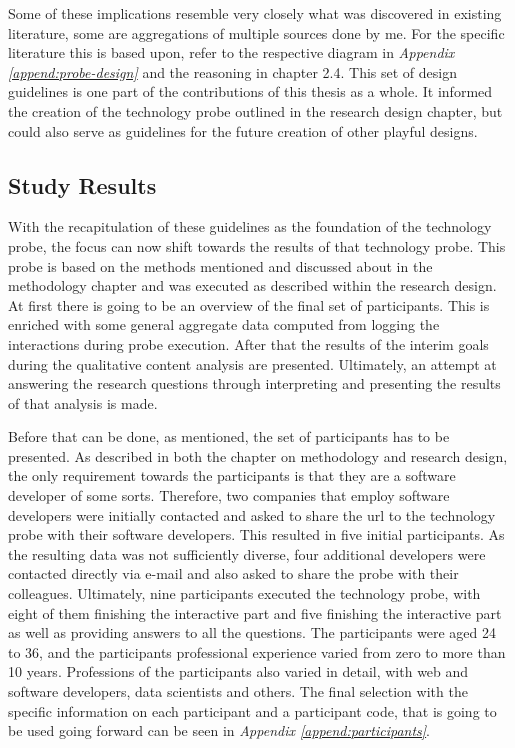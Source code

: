 Some of these implications resemble very closely what was discovered in existing literature, some are aggregations of multiple sources done by me. For the specific literature this is based upon, refer to the respective diagram in \textit{Appendix \ref{append:probe-design}} and the reasoning in chapter 2.4. This set of design guidelines is one part of the contributions of this thesis as a whole. It informed the creation of the technology probe outlined in the research design chapter, but could also serve as guidelines for the future creation of other playful designs.

\subsection{Study Results}

With the recapitulation of these guidelines as the foundation of the technology probe, the focus can now shift towards the results of that technology probe. This probe is based on the methods mentioned and discussed about in the methodology chapter and was executed as described within the research design. At first there is going to be an overview of the final set of participants. This is enriched with some general aggregate data computed from logging the interactions during probe execution. After that the results of the interim goals during the qualitative content analysis are presented. Ultimately, an attempt at answering the research questions through interpreting and presenting the results of that analysis is made.

Before that can be done, as mentioned, the set of participants has to be presented. As described in both the chapter on methodology and research design, the only requirement towards the participants is that they are a software developer of some sorts. Therefore, two companies that employ software developers were initially contacted and asked to share the \gls{url} to the technology probe with their software developers. This resulted in five initial participants. As the resulting data was not sufficiently diverse, four additional developers were contacted directly via e-mail and also asked to share the probe with their colleagues. Ultimately, nine participants executed the technology probe, with eight of them finishing the interactive part and five finishing the interactive part as well as providing answers to all the questions. The participants were aged 24 to 36, and the participants professional experience varied from zero to more than 10 years. Professions of the participants also varied in detail, with web and software developers, data scientists and others. The final selection with the specific information on each participant and a participant code, that is going to be used going forward can be seen in \textit{Appendix \ref{append:participants}}.

